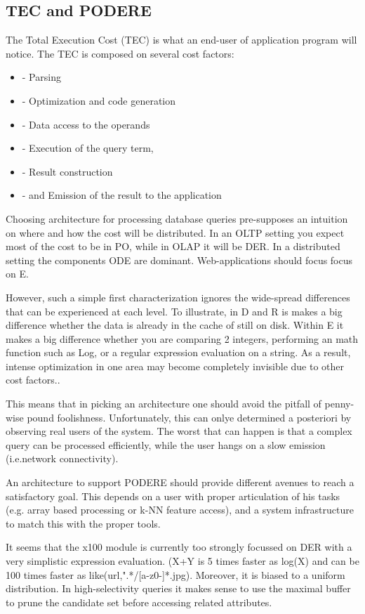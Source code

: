 \documentclass[10pt,twocolumn,fleqn]{article}
\begin{document}
\subsection{TEC and PODERE}
The Total Execution Cost (TEC) is what an end-user of application program will
notice. The TEC is composed on several cost factors: 
\begin{itemize}
\item - Parsing
\item - Optimization and code generation
\item - Data access to the operands
\item - Execution of the query term,
\item- Result construction 
\item - and Emission of the result to the application
\end{itemize}
Choosing architecture for processing database queries pre-supposes an
intuition on where and how the cost will be distributed. In an OLTP
setting you expect most of the cost to be in PO, while in OLAP it will
be DER. In a distributed setting the components ODE are dominant.
Web-applications should focus focus on E.

However, such a simple first characterization ignores the wide-spread
differences that can be experienced at each level. To illustrate,
in D and R is makes a big difference whether the data is already in the
cache of still on disk. Within E it makes a big difference whether you
are comparing 2 integers, performing an math function such as Log, or
a regular expression evaluation on a string.
As a result, intense optimization in one area may become completely invisible
due to other cost factors..

This means that in picking an architecture one should avoid the pitfall of
penny-wise pound foolishness. Unfortunately, this can onlye determined a
posteriori by observing real users of the system. The worst that can happen
is that a complex query can be processed efficiently, while the user
hangs on a slow emission (i.e.network connectivity).

An architecture to support PODERE should provide different avenues to
reach a satisfactory goal. This depends on a user with proper articulation
of his tasks (e.g. array based processing or k-NN feature access), and
a system infrastructure to match this with the proper tools.

It seems that the x100 module is currently too strongly focussed on DER
with a very simplistic expression evaluation. (X+Y is 5 times faster as
log(X) and can be 100 times faster as like(url,".*/[a-z0-]*.jpg).
Moreover, it is biased to a uniform distribution. In high-selectivity queries
it makes sense to use the maximal buffer to prune the candidate set before
accessing related attributes.
\end{document}

